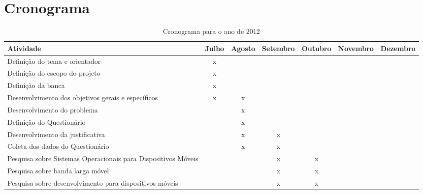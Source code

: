 \chapter{Cronograma}
\begin{table}[!hbt]
\caption[Cronograma 2012]{Cronograma para o ano de 2012}
\begin{tabular}{|p{5cm}|c|c|c|c|c|c|}\hline
Atividade                                                                                                              & Julho & Agosto & Setembro & Outubro & Novembro & Dezembro  \\ \hline
  Definição do tema e orientador                                                                          &x&&&&&           \\ \hline
  Definição do escopo do projeto                                                                         &x&&&&&           \\ \hline
  Definição da banca                                                                                              &x&&&&&           \\ \hline
  Desenvolvimento dos objetivos gerais e específicos                                    &x&x&&&&           \\ \hline
  Desenvolvimento do problema                                                                          &&x&&&&           \\ \hline
  Definição do Questionário                                                                          &&x&&&&           \\ \hline
  Desenvolvimento da justificativa                                                                       &&x&x&&&           \\ \hline
  Coleta dos dados do Questionário                                                                       &&x&x&&&           \\ \hline
  Pesquisa sobre Sistemas Operacionais para Dispositivos Móveis            
  &&&x&x&&           \\ \hline    
  Pesquisa sobre banda larga móvel                                                                     &&&x&x&&           \\ \hline    
  Pesquisa sobre desenvolvimento para dispositivos móveis                       
  &&&x&x&&           \\ \hline           

\end{tabular}
\end{table}

